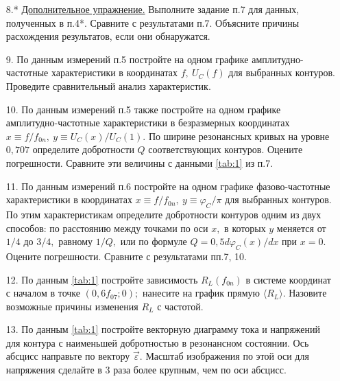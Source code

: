 \begin{lab:task}
\begin{enumerate}
    \item[8.*] \underline{Дополнительное упражнение.} Выполните задание п.7 для данных, полученных в п.4*. Сравните с результатами п.7. Объясните причины расхождения результатов, если они обнаружатся.
    \item[9.] По данным измерений п.5 постройте на одном графике амплитудно-частотные характеристики в координатах $ f,~U_C(f)$ для выбранных контуров. Проведите сравнительный анализ характеристик.
    \item[10.] По данным измерений п.5 также постройте на одном графике амплитудно-частотные характеристики в безразмерных координатах $x\equiv f/f_{0n},~y\equiv U_C(x)/U_C(1).$ По ширине резонансных кривых на уровне $0,707$ определите добротности $Q$ соответствующих контуров. Оцените погрешности. Сравните эти величины с данными \eqref{tab:1} из п.7.
    \item[11.] По данным измерений п.6 постройте на одном графике фазово-частотные характеристики в координатах $x\equiv f/f_{0n},~y\equiv\varphi_C/\pi$ для выбранных контуров. По этим характеристикам определите добротности контуров одним из двух способов: по расстоянию между точками по оси $x,$ в которых $y$ меняется от $1/4$ до $3/4,$ равному $1/Q,$ или по формуле $Q=0,5d\varphi_C(x)/dx$ при $x=0.$ Оцените погрешности. Сравните с результатами пп.7, 10.
    \item[12.] По данным \eqref{tab:1} постройте зависимость $R_L(f_{0n})$ в системе координат с началом в точке $(0,6f_{07};0);$ нанесите на график прямую $\langle R_L\rangle.$ Назовите возможные причины изменения $R_L$ с частотой.
    \item[13.] По данным \eqref{tab:1} постройте векторную диаграмму тока и напряжений для контура с наименьшей добротностью в резонансном состоянии. Ось абсцисс направьте по вектору $\vec \varepsilon.$ Масштаб изображения по этой оси для напряжения сделайте в 3 раза более крупным, чем по оси абсцисс.
	\end{enumerate}
\end{lab:task}



